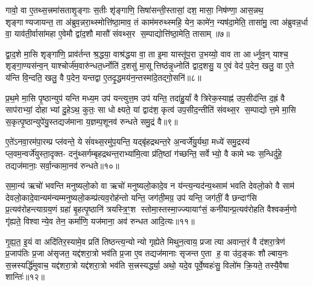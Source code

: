 {\anuvakamend[{गो॒स॒त्त्रं वा ए॑ति सं वथ्स॒रोऽर्धमा॒सा मि॑थु॒नम्म॑ध्य॒तो दे॑व॒याने॑नै॒व वी॒र्य॑न्त्रयो॑दश च॥१॥}]}

गावो॒ वा ए॒तथ्स॒त्त्रमा॑सताशृ॒ङ्गाः स॒तीः शृ॑ङ्गाणि॒ सिषा॑सन्ती॒स्तासां॒ दश॒ मासा॒ निष॑ण्णा॒ आस॒न्नथ॒ शृङ्गाण्यजायन्त॒ ता अ॑ब्रुव॒न्नरा॒थ्स्मोत्ति॑ष्ठा॒माव॒ तं काम॑मरुथ्स्महि॒ येन॒ कामे॑न॒ न्यष॑दा॒मेति॒ तासा॑मु॒ त्वा अ॑ब्रुवन्न॒र्धा वा॒ याव॑ती॒र्वासा॑महा ए॒वेमौ द्वा॑द॒शौ मासौ॑ संवथ्स॒र स॒म्पाद्योत्ति॑ष्ठा॒मेति॒ तासाम्॥७॥

द्वा॒द॒शे मा॒सि शृङ्गा॑णि॒ प्राव॑र्तन्त श्र॒द्धया॒ वाश्र॑द्धया वा॒ ता इ॒मा यास्तू॑प॒रा उ॒भय्यो॒ वाव ता आर्ध्नुव॒न् याश्च॒ शृङ्गा॒ण्यस॑न्व॒न् याश्चोर्ज॑म॒वारु॑न्धत॒र्ध्नोति॑ द॒शसु॑ मा॒सूत्तिष्ठ॑न्नृ॒ध्नोति॑ द्वाद॒शसु॒ य ए॒वं वेद॑ प॒देन॒ खलु॒ वा ए॒ते य॑न्ति वि॒न्दति॒ खलु॒ वै प॒देन॒ यन्तद्वा ए॒तदृ॒द्धमय॑न॒न्तस्मा॑दे॒तद्गो॒सनि॑॥८॥

{\anuvakamend[{ति॒ष्ठा॒मेति॒ तासा॒न्तस्मा॒द्द्वे च॑॥२॥}]}

प्र॒थ॒मे मा॒सि पृ॒ष्ठान्युप॑ यन्ति मध्य॒म उप॑ यन्त्युत्त॒म उप॑ यन्ति॒ तदा॑हु॒र्यां वै त्रिरेक॒स्याह्न॑ उप॒सीद॑न्ति द॒ह्रं वै साप॑राभ्यां॒ दोहाभ्यां दु॒हेऽथ॒ कुतः॒ सा धोक्ष्यते॒ यां द्वाद॑श॒ कृत्व॑ उप॒सीद॒न्तीति॑ संवथ्स॒र स॒म्पाद्योत्त॒मे मा॒सि स॒कृत्पृ॒ष्ठान्युपे॑यु॒स्तद्यज॑माना य॒ज्ञम्प॒शूनव॑ रुन्धते समु॒द्रं वै॥९॥

ए॒ते॑ऽनवा॒रम॑पा॒रम्प्र प्ल॑वन्ते॒ ये सं॑वथ्स॒रमु॑प॒यन्ति॒ यद्बृ॑हद्रथन्त॒रे अ॒न्वर्जे॑यु॒र्यथा॒ मध्ये॑ समु॒द्रस्य॑ प्ल॒वम॒न्वर्जे॑युस्ता॒दृक्त- दनु॑थ्सर्गम्बृहद्रथन्त॒राभ्या॑मि॒त्वा प्र॑ति॒ष्ठां ग॑च्छन्ति॒ सर्वेभ्यो॒ वै कामेभ्यः स॒न्धिर्दु॑हे॒ तद्यज॑मानाः॒ सर्वा॒न्कामा॒नव॑ रुन्धते॥१०॥

{\anuvakamend[{स॒मु॒द्रं वै चतु॑स्त्रिशच्च॥३॥}]}

स॒मा॒न्य॑ ऋचो॑ भवन्ति मनुष्यलो॒को वा ऋचो॑ मनुष्यलो॒कादे॒व न य॑न्त्य॒न्यद॑न्य॒थ्साम॑ भवति देवलो॒को वै साम॑ देवलो॒कादे॒वान्यम॑न्यम्मनुष्यलो॒कम्प्र॑त्यव॒रोह॑न्तो यन्ति॒ जग॑ती॒मग्र॒ उप॑ यन्ति॒ जग॑तीं॒ वै छन्दाꣳ॑सि प्र॒त्यव॑रोहन्त्याग्रय॒णं ग्रहा॑ बृ॒हत्पृ॒ष्ठानि॑ त्रयस्त्रि॒ꣳ॒श स्तोमा॒स्तस्मा॒ज्ज्यायाꣳ॑सं॒ कनी॑यान्प्र॒त्यव॑रोहति वैश्वकर्म॒णो गृ॑ह्यते॒ विश्वान्ये॒व तेन॒ कर्मा॑णि॒ यज॑माना॒ अव॑ रुन्धत आदि॒त्यः॥११॥

गृ॒ह्य॒त॒ इ॒यं वा अदि॑तिर॒स्यामे॒व प्रति॑ तिष्ठन्त्य॒न्योन्यो गृह्येते मिथुन॒त्वाय॒ प्रजात्या अवान्त॒रं वै द॑शरा॒त्रेण॑ प्र॒जाप॑तिः प्र॒जा अ॑सृजत॒ यद्द॑शरा॒त्रो भव॑ति प्र॒जा ए॒व तद्यज॑मानाः सृजन्त ए॒ता ह॒ वा उ॑द॒ङ्कः शौल्बाय॒नः स॒त्त्रस्यर्द्धि॑मुवाच॒ यद्द॑शरा॒त्रो यद्द॑शरा॒त्रो भव॑ति स॒त्त्रस्यर्द्ध्या॒ अथो॒ यदे॒व पूर्वे॒ष्वहः॑सु॒ विलो॑म क्रि॒यते॒ तस्यै॒वैषा शान्तिः॑॥१२॥

